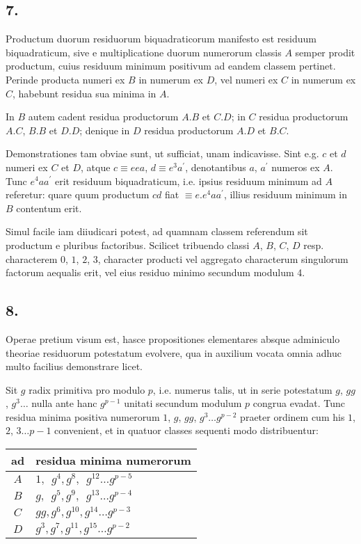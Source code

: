 \documentclass[twoside,12pt]{memoir}
\begin{document}
\subsection*{7.}
 
Productum duorum residuorum biquadraticorum manifesto est residuum biquadraticum, sive e multiplicatione duorum numerorum classis \(A\) semper prodit productum, cuius residuum minimum positivum ad eandem classem pertinet. Perinde producta numeri ex \(B\) in numerum ex \(D\), vel numeri ex \(C\) in numerum ex \(C\), habebunt residua sua minima in \(A\).
 
In \(B\) autem cadent residua productorum \(A . B\) et \(C . D\); in \(C\) residua productorum \(A . C\), \(B . B\) et \(D . D\); denique in \(D\) residua productorum \(A . D\) et \(B . C\).
 
Demonstrationes tam obviae sunt, ut sufficiat, unam indicavisse. Sint e.g. \(c\) et \(d\) numeri ex \(C\) et \(D\), atque \(c \equiv e e a\), \(d \equiv e^{3} a^{\prime}\), denotantibus \(a\), \(a^{\prime}\) numeros ex \(A\). Tunc \(e^{4} a a^{\prime}\) erit residuum biquadraticum, i.e. ipsius residuum minimum ad \(A\) referetur: quare quum productum \(c d\) fiat \(\equiv e . e^{4} a a^{\prime}\), illius residuum minimum in \(B\) contentum erit.
 
Simul facile iam diiudicari potest, ad quamnam classem referendum sit productum e pluribus factoribus. Scilicet tribuendo classi \(A\), \(B\), \(C\), \(D\) resp. characterem \(0\), \(1\), \(2\), \(3\), character producti vel aggregato characterum singulorum factorum aequalis erit, vel eius residuo minimo secundum modulum 4.

\subsection*{8.}
 
Operae pretium visum est, hasce propositiones elementares absque adminiculo theoriae residuorum potestatum evolvere, qua in auxilium vocata omnia adhuc multo facilius demonstrare licet.
 
Sit \(g\) radix primitiva pro modulo \(p\), i.e. numerus talis, ut in serie potestatum \(g\), \(g g\), \(g^{3} \ldots\) nulla ante hanc \(g^{p-1}\) unitati secundum modulum \(p\) congrua evadat. Tunc residua minima positiva numerorum \(1\), \(g\), \(g g\), \(g^{3} \ldots g^{p-2}\) praeter ordinem cum his \(1\), \(2\), \(3 \ldots p-1\) convenient, et in quatuor classes sequenti modo distribuentur:\pagebreak%
\begin{center}
\begin{tabular}{c|l}
ad & residua minima numerorum \\
\hline
\(A\) & \(1,\phantom{g} g^{4}, g^{8}, \phantom{g}g^{12} \ldots g^{p-5}\) \\
\(B\) & \(g,\phantom{g} g^{5}, g^{9}, \phantom{g}g^{13} \ldots g^{p-4}\) \\
\(C\) & \(g g, g^{6}, g^{10}, g^{14} \ldots g^{p-3}\) \\
\(D\) & \(g^{3}, g^{7}, g^{11}, g^{15} \ldots g^{p-2}\) \\
\end{tabular}
\end{center}
 
\end{document}
